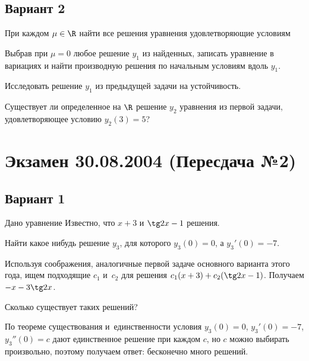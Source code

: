 \documentclass{article}
\begin{document}
\setcounter{problem}{0}
\subsection{Вариант 2}

\begin{problem}[2 балла]
  При каждом $\mu \in \R$ найти все решения уравнения  удовлетворяющие
  условиям
\end{problem}

\begin{problem}[2]
Выбрав при $\mu=0$ любое решение $y_1$ из найденных, записать уравнение в вариациях и найти
производную решения по начальным условиям вдоль $y_1$.
\end{problem}

\begin{problem}[3 балла]
Исследовать решение $y_1$ из предыдущей задачи на устойчивость.
\end{problem}

\begin{problem}[2 балла]
Существует ли определенное на $\R$ решение $y_2$ уравнения из первой задачи, удовлетворяющее
условию $y_2(3)=5$?
\end{problem}

\section{Экзамен 30.08.2004 (Пересдача №2)}

\subsection{Вариант 1}

Дано уравнение
Известно, что $x+3$ и $\tg 2x - 1$ решения.

\begin{problem}[2 балла]
  Найти какое нибудь решение $y_3$, для которого $y_3(0)=0$, а $y_3'(0) = -7$.
\end{problem}
\begin{solution}
  Используя соображения, аналогичные первой задаче основного варианта этого года, ищем
  подходящие $c_1$ и~$c_2$ для решения $c_1(x+3)+c_2(\tg 2x-1)$. Получаем $-x-3\tg 2x$.
\end{solution}

\begin{problem}[2 балла]
  Сколько существует таких решений?
\end{problem}
\begin{solution}
  По теореме существования и~единственности условия $y_3(0)=0$, $y_3'(0)=-7$, $y_3''(0)=c$ дают единственное решение
  при каждом $c$, но $c$ можно выбирать произвольно, поэтому получаем ответ: бесконечно много решений.
\end{solution}
\end{document}
